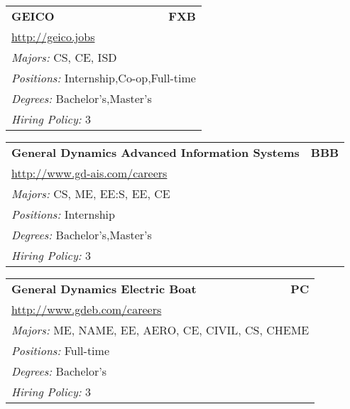 \documentclass[twoside]{article}
\begin{document}
\begin{center}
\begin{multicols}{3}
\begin{FlushLeft}
\begin{minipage}{\columnwidth}
\end{minipage}
 
\begin{minipage}{\columnwidth}\begin{tabularx}{.95\columnwidth}{Xr}
                 {\Large\bf GEICO} & {\Large\bf FXB}\\
    \multicolumn{2}{p{.95\columnwidth}}{\url{http://geico.jobs}}\\
    \multicolumn{2}{p{.95\columnwidth}}{\emph{Majors:} CS, CE, ISD}\\
    \multicolumn{2}{p{.95\columnwidth}}{\emph{Positions:} Internship,Co-op,Full-time}\\
    \multicolumn{2}{p{.95\columnwidth}}{\emph{Degrees:} Bachelor's,Master's}\\
    \multicolumn{2}{p{.95\columnwidth}}{\emph{Hiring Policy:} 3}\\
    \end{tabularx}
    
\end{minipage}
 
\begin{minipage}{\columnwidth}\begin{tabularx}{.95\columnwidth}{Xr}
                 {\Large\bf General Dynamics Advanced Information Systems} & {\Large\bf BBB}\\
    \multicolumn{2}{p{.95\columnwidth}}{\url{http://www.gd-ais.com/careers}}\\
    \multicolumn{2}{p{.95\columnwidth}}{\emph{Majors:} CS, ME, EE:S, EE, CE}\\
    \multicolumn{2}{p{.95\columnwidth}}{\emph{Positions:} Internship}\\
    \multicolumn{2}{p{.95\columnwidth}}{\emph{Degrees:} Bachelor's,Master's}\\
    \multicolumn{2}{p{.95\columnwidth}}{\emph{Hiring Policy:} 3}\\
    \end{tabularx}
    
\end{minipage}
 
\begin{minipage}{\columnwidth}\begin{tabularx}{.95\columnwidth}{Xr}
                 {\Large\bf General Dynamics Electric Boat} & {\Large\bf PC}\\
    \multicolumn{2}{p{.95\columnwidth}}{\url{http://www.gdeb.com/careers}}\\
    \multicolumn{2}{p{.95\columnwidth}}{\emph{Majors:} ME, NAME, EE, AERO, CE, CIVIL, CS, CHEME}\\
    \multicolumn{2}{p{.95\columnwidth}}{\emph{Positions:} Full-time}\\
    \multicolumn{2}{p{.95\columnwidth}}{\emph{Degrees:} Bachelor's}\\
    \multicolumn{2}{p{.95\columnwidth}}{\emph{Hiring Policy:} 3}\\
    \end{tabularx}
    

\end{minipage}
\end{FlushLeft}
\end{multicols}
\end{center}
\end{document}
